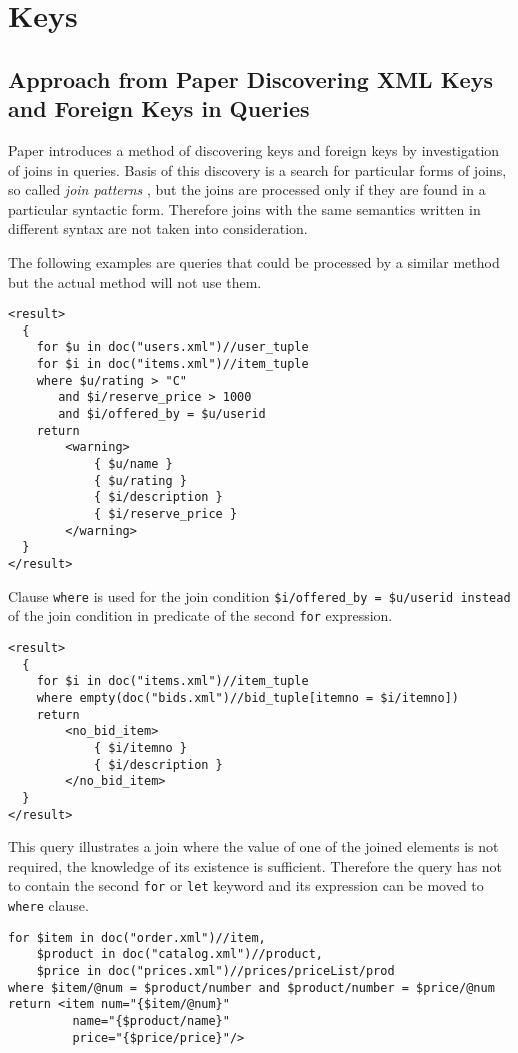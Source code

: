 \section{Keys}

\subsection{Approach from Paper Discovering XML Keys and Foreign Keys in Queries}
Paper  introduces a method of discovering keys and foreign keys by investigation of joins in queries. Basis of this discovery is a search for particular forms of joins, so called \emph{join patterns} , but the joins are processed only if they are found in a particular syntactic form. Therefore joins with the same semantics written in different syntax are not taken into consideration.

The following examples are queries that could be processed by a similar method but the actual method will not use them.

\begin{verbatim}
<result>
  {
    for $u in doc("users.xml")//user_tuple
    for $i in doc("items.xml")//item_tuple
    where $u/rating > "C" 
       and $i/reserve_price > 1000 
       and $i/offered_by = $u/userid
    return
        <warning>
            { $u/name }
            { $u/rating }
            { $i/description }
            { $i/reserve_price }
        </warning>
  }
</result>
\end{verbatim}

Clause \texttt{where} is used for the join condition \texttt{\$i/offered\_by = \$u/userid instead} of the join condition in predicate of the second \texttt{for} expression.

\begin{verbatim}
<result>
  {
    for $i in doc("items.xml")//item_tuple
    where empty(doc("bids.xml")//bid_tuple[itemno = $i/itemno])
    return
        <no_bid_item>
            { $i/itemno }
            { $i/description }
        </no_bid_item>
  }
</result>
\end{verbatim}

This query illustrates a join where the value of one of the joined elements is not required, the knowledge of its existence is sufficient. Therefore the query has not to contain the second \texttt{for} or \texttt{let} keyword and its expression can be moved to \texttt{where} clause.

\begin{verbatim}
for $item in doc("order.xml")//item, 
    $product in doc("catalog.xml")//product, 
    $price in doc("prices.xml")//prices/priceList/prod 
where $item/@num = $product/number and $product/number = $price/@num 
return <item num="{$item/@num}" 
         name="{$product/name}" 
         price="{$price/price}"/>
\end{verbatim}


